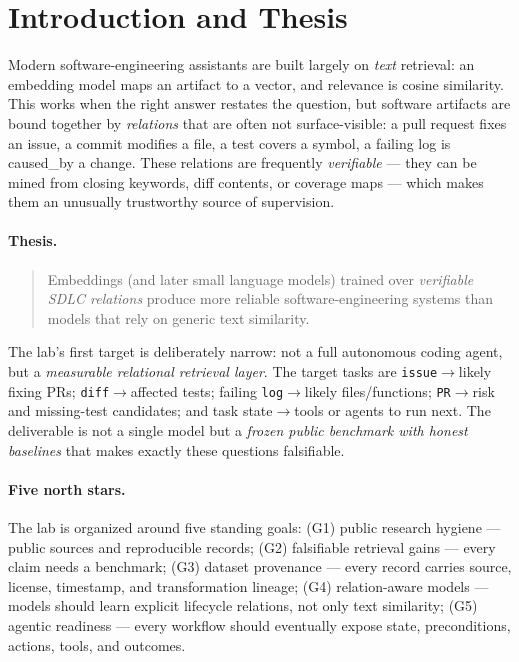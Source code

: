 \documentclass[11pt]{article}
\newcommand{\code}[1]{\texttt{#1}}
\newcommand{\rel}[1]{\textsf{#1}}
\begin{document}
\tableofcontents
\vspace{1em}

\section{Introduction and Thesis}
\label{sec:intro}

Modern software-engineering assistants are built largely on \emph{text} retrieval:
an embedding model maps an artifact to a vector, and relevance is cosine
similarity. This works when the right answer restates the question, but software
artifacts are bound together by \emph{relations} that are often not surface-visible:
a pull request \rel{fixes} an issue, a commit \rel{modifies} a file, a test
\rel{covers} a symbol, a failing log is \rel{caused\_by} a change. These relations
are frequently \emph{verifiable} --- they can be mined from closing keywords, diff
contents, or coverage maps --- which makes them an unusually trustworthy source of
supervision.

\paragraph{Thesis.}
\begin{quote}
Embeddings (and later small language models) trained over \emph{verifiable SDLC
relations} produce more reliable software-engineering systems than models that rely
on generic text similarity.
\end{quote}

The lab's first target is deliberately narrow: not a full autonomous coding agent,
but a \emph{measurable relational retrieval layer}. The target tasks are
\code{issue}$\to$likely fixing PRs; \code{diff}$\to$affected tests; failing
\code{log}$\to$likely files/functions; \code{PR}$\to$risk and missing-test
candidates; and task state$\to$tools or agents to run next. The deliverable is not a
single model but a \emph{frozen public benchmark with honest baselines} that makes
exactly these questions falsifiable.

\paragraph{Five north stars.}
The lab is organized around five standing goals:
(G1) public research hygiene --- public sources and reproducible records;
(G2) falsifiable retrieval gains --- every claim needs a benchmark;
(G3) dataset provenance --- every record carries source, license, timestamp, and
transformation lineage;
(G4) relation-aware models --- models should learn explicit lifecycle relations,
not only text similarity;
(G5) agentic readiness --- every workflow should eventually expose state,
preconditions, actions, tools, and outcomes.
\end{document}

